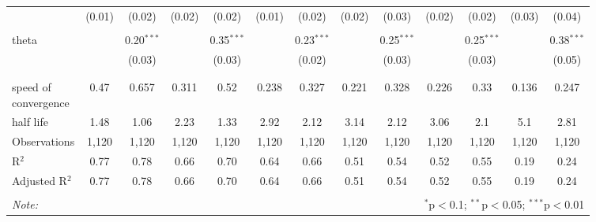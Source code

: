 \begin{sidewaystable}[!htbp]
\begin{tabular}{@{\extracolsep{0.1pt}}lcccccccccccc}
  & (0.01) & (0.02) & (0.02) & (0.02) & (0.01) & (0.02) & (0.02) & (0.03) & (0.02) & (0.02) & (0.03) & (0.04) \\ 
  & & & & & & & & & & & & \\ 
 theta &  & 0.20$^{***}$ &  & 0.35$^{***}$ &  & 0.23$^{***}$ &  & 0.25$^{***}$ &  & 0.25$^{***}$ &  & 0.38$^{***}$ \\ 
  &  & (0.03) &  & (0.03) &  & (0.02) &  & (0.03) &  & (0.03) &  & (0.05) \\ 
  & & & & & & & & & & & & \\ 
\hline \\[-1.8ex] 
\shortstack{speed of\\ convergence} & 0.47 & 0.657 & 0.311 & 0.52 & 0.238 & 0.327 & 0.221 & 0.328 & 0.226 & 0.33 & 0.136 & 0.247 \\ 
half life & 1.48 & 1.06 & 2.23 & 1.33 & 2.92 & 2.12 & 3.14 & 2.12 & 3.06 & 2.1 & 5.1 & 2.81 \\ 
Observations & 1,120 & 1,120 & 1,120 & 1,120 & 1,120 & 1,120 & 1,120 & 1,120 & 1,120 & 1,120 & 1,120 & 1,120 \\ 
R$^{2}$ & 0.77 & 0.78 & 0.66 & 0.70 & 0.64 & 0.66 & 0.51 & 0.54 & 0.52 & 0.55 & 0.19 & 0.24 \\ 
Adjusted R$^{2}$ & 0.77 & 0.78 & 0.66 & 0.70 & 0.64 & 0.66 & 0.51 & 0.54 & 0.52 & 0.55 & 0.19 & 0.24 \\ 
\hline 
\hline \\[-1.8ex] 
\textit{Note:}  & \multicolumn{12}{r}{$^{*}$p$<$0.1; $^{**}$p$<$0.05; $^{***}$p$<$0.01} \\ 
\end{tabular} 
\end{sidewaystable} 
